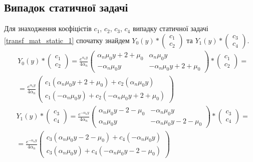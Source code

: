 \subsection*{Випадок статичної задачі}
Для знаходження коєфіцієтів $c_1$, $c_2$, $c_3$, $c_4$ випадку статичної задачі \eqref{transf_mat_static_1} спочатку
знайдем $Y_0(y) * \begin{pmatrix}c_1 \\ c_2\end{pmatrix}$ та $Y_1(y) * \begin{pmatrix}c_3 \\ c_4\end{pmatrix}$.
\begin{align*}
    &Y_0(y) * \begin{pmatrix}c_1 \\ c_2\end{pmatrix} = \frac{e^{\alpha_n y}}{4\alpha_n} \begin{pmatrix}
        \alpha_n \mu_0 y + 2 + \mu_0 & \alpha_n \mu_0 y \\
        -\alpha_n \mu_0 y & -\alpha_n \mu_0 y + 2 + \mu_0
        \end{pmatrix} * \begin{pmatrix}c_1 \\ c_2\end{pmatrix} = \\
    &=\frac{e^{\alpha_n y}}{4\alpha_n} \begin{pmatrix}
        c_1(\alpha_n \mu_0 y + 2 + \mu_0) + c_2(\alpha_n \mu_0 y) \\
        c_1(-\alpha_n \mu_0 y) + c_2(-\alpha_n \mu_0 y + 2 + \mu_0)
        \end{pmatrix}
\end{align*}
\begin{align*}
    &Y_1(y) * \begin{pmatrix}c_3 \\ c_4\end{pmatrix} = \frac{e^{-\alpha_n y}}{4\alpha_n} \begin{pmatrix}
        \alpha_n \mu_0 y - 2 - \mu_0 & -\alpha_n \mu_0 y \\
        \alpha_n \mu_0 y & -\alpha_n \mu_0 y - 2 - \mu_0
        \end{pmatrix} * \begin{pmatrix}c_3 \\ c_4\end{pmatrix} = \\
    &=\frac{e^{-\alpha_n y}}{4\alpha_n} \begin{pmatrix}
        c_3(\alpha_n \mu_0 y - 2 - \mu_0) + c_4(-\alpha_n \mu_0 y) \\
        c_3(\alpha_n \mu_0 y) + c_4(-\alpha_n \mu_0 y - 2 - \mu_0)
        \end{pmatrix}
\end{align*}
